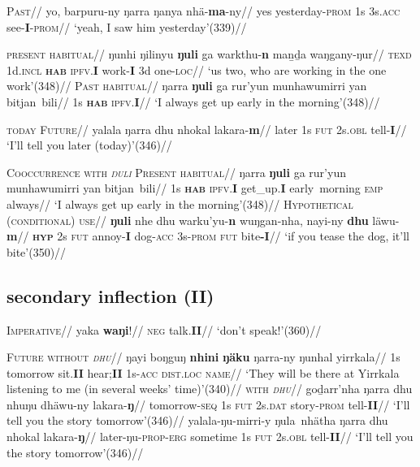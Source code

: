 \documentclass[12pt]{article}
\begin{document}
\pex\begingl{}
\glpreamble\textsc{Past}//
\gla yo, barpuru-ny ŋarra ŋanya nhä-\textbf{ma}-ny//
\glb yes yesterday\textsc{-prom} 1s 3s.\textsc{acc} see-\textbf{I}-\textsc{prom}//
\glft`yeah, I saw him yesterday'\hfill(339)//
\endgl\xe

\pex\a\begingl{}
\glpreamble\textsc{present habitual}//
\gla ŋunhi ŋilinyu \textbf{ŋuli} ga warkthu-\textbf{n} maṉḏa waŋgany-ŋur//
\glb \textsc{texd} 1d\textsc{.incl} \textsc{\textbf{hab}} \textsc{ipfv.\textbf{I}} work-\textbf{I} 3d one-\textsc{loc}//
\glft`us two, who are working in the one work'\hfill(348)//\endgl
\a\begingl\glpreamble\textsc{Past habitual}//
\gla ŋarra \textbf{ŋuli} ga rur'yun munhawumirri yan bitjan~bili//
\glb 1s \textsc{\textbf{hab}} \textsc{ipfv.\textbf{I}}//
\glft `I always get up early in the morning'\hfill(348)//
\endgl\xe

\pex\begingl{}\glpreamble \textsc{today Future}//
\gla yalala ŋarra dhu nhokal lakara-\textbf{m}//
\glb later 1s \textsc{fut} 2s.\textsc{obl} tell-\textbf{I}//
\glft`I'll tell you later (today)'\hfill(346)//\endgl\xe

\pex \textsc{Cooccurrence with \textit{ŋuli}}
\a\begingl\glpreamble\textsc{Present habitual}//
\gla ŋarra \textbf{ŋuli} ga rur'yun munhawumirri yan bitjan~bili//
\glb 1s \textsc{\textbf{hab}} \textsc{ipfv.\textbf{I}} get\_up.\textbf{I} early~morning \textsc{emp} always//
\glft`I always get up early in the morning'\hfill(348)//\endgl
\a\begingl\glpreamble\textsc{Hypothetical (conditional) use}//
\gla \textbf{ŋuli} nhe dhu warku'yu-\textbf{n} wuŋgan-nha, nayi-ny \textbf{dhu} läwu-\textbf{m}//
\glb \textsc{\textbf{hyp}} 2s \textsc{fut} annoy-\textbf{I} dog\textsc{-acc} 3s-\textsc{prom} \textsc{fut} bite\textbf{-I}//
\glft `if you tease the dog, it'll bite'\hfill(350)//
\endgl\xe

\subsection{secondary inflection (II)}
\pex{}\begingl\glpreamble\textsc{Imperative}//
\gla yaka \textbf{waŋi}!//
\glb \textsc{neg} talk.\textbf{II}//
\glft`don't speak!'\hfill(360)//\endgl\xe

\pex\textsc{Future}
\a\begingl\glpreamble\textsc{without \textit{dhu}}//
\gla ŋayi boŋguŋ \textbf{nhini} \textbf{ŋäku} ŋarra-ny ŋunhal yirrkala//
\glb 1s tomorrow sit.\textbf{II} hear;\textbf{II} 1s\textsc{-acc} \textsc{dist.loc} \textsc{name}//
\glft`They will be there at Yirrkala listening to me (in several weeks' time)'\hfill(340)//
\endgl
\a\begingl\glpreamble\textsc{with \textit{dhu}}//
\gla goḏarr'nha ŋarra dhu nhuŋu dhäwu-ny lakara-\textbf{ŋ}//
\glb tomorrow\textsc{-seq} 1s \textsc{fut} 2s\textsc{.dat} story\textsc{-prom} tell-\textbf{II}//
\glft`I'll tell you the story tomorrow'\hfill(346)//\endgl
\a\begingl\gla yalala-ŋu-mirri-y ŋula~nhätha ŋarra dhu nhokal lakara-\textbf{ŋ}//
\glb later-ŋu\textsc{-prop-erg} sometime 1s \textsc{fut} 2s\textsc{.obl} tell-\textbf{II}//
\glft`I'll tell you the story tomorrow'\hfill(346)//\endgl\xe
\end{document}
